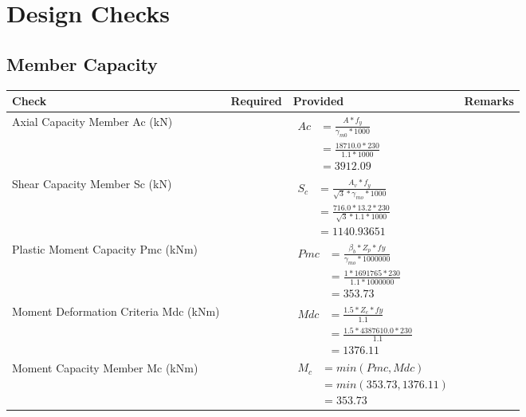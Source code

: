\documentclass{article}%
\begin{document}
%
%
\section{Design Checks}%
\label{sec:DesignChecks}%
\subsection{Member Capacity}%
\label{subsec:MemberCapacity}%
\renewcommand{\arraystretch}{1.2}%
\begin{longtable}{|p{4cm}|p{5cm}|p{5.5cm}|p{1.5cm}|}%
\hline%
\rowcolor{OsdagGreen}%
Check&Required&Provided&Remarks\\%
\hline%
\endhead%
\hline%
Axial Capacity Member Ac (kN)&&$\begin{aligned} Ac &=\frac{A*f_y}{\gamma_{m0} *1000}\\ &=\frac{18710.0*230}{1.1* 1000}\\ &=3912.09\end{aligned}$&\\%
\hline%
Shear Capacity Member Sc (kN)&&$\begin{aligned} S_c &= \frac{A_v*f_y}{\sqrt{3}*\gamma_{mo} *1000}\\ &=\frac{716.0*13.2*230}{\sqrt{3}*1.1 *1000}\\ &=1140.93651\end{aligned}$&\\%
\hline%
Plastic Moment Capacity Pmc (kNm)&&$\begin{aligned} Pmc &= \frac{\beta_b * Z_p *fy}{\gamma_{mo} * 1000000}\\ &=\frac{1*1691765*230}{1.1 * 1000000}\\ &=353.73\end{aligned}$&\\%
\hline%
Moment Deformation Criteria Mdc (kNm)&&$\begin{aligned} Mdc &= \frac{1.5 *Z_e *fy}{1.1}\\ &= \frac{1.5 *4387610.0*230}{1.1}\\ &= 1376.11\end{aligned}$&\\%
\hline%
Moment Capacity Member Mc (kNm)&&$\begin{aligned} M_c &= min(Pmc,Mdc)\\ &=min(353.73,1376.11)\\ &=353.73\end{aligned}$&\\%
\hline%
\end{longtable}
\end{document}
